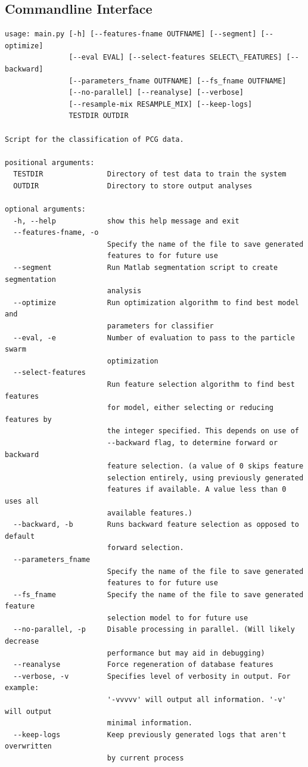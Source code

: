 \documentclass[titlepage, 12pt]{scrartcl} \usepackage{enumitem}
\begin{document}
\subsection{Commandline Interface}\label{appendixB}
\singlespacing
\lstset{basicstyle=\tiny, style=mystyle}
\begin{lstlisting}[numbers=none]
usage: main.py [-h] [--features-fname OUTFNAME] [--segment] [--optimize]
               [--eval EVAL] [--select-features SELECT\_FEATURES] [--backward]
               [--parameters_fname OUTFNAME] [--fs_fname OUTFNAME]
               [--no-parallel] [--reanalyse] [--verbose]
               [--resample-mix RESAMPLE_MIX] [--keep-logs]
               TESTDIR OUTDIR

Script for the classification of PCG data.

positional arguments:
  TESTDIR               Directory of test data to train the system
  OUTDIR                Directory to store output analyses

optional arguments:
  -h, --help            show this help message and exit
  --features-fname, -o
                        Specify the name of the file to save generated
                        features to for future use
  --segment             Run Matlab segmentation script to create segmentation
                        analysis
  --optimize            Run optimization algorithm to find best model and
                        parameters for classifier
  --eval, -e            Number of evaluation to pass to the particle swarm
                        optimization
  --select-features
                        Run feature selection algorithm to find best features
                        for model, either selecting or reducing features by
                        the integer specified. This depends on use of
                        --backward flag, to determine forward or backward
                        feature selection. (a value of 0 skips feature
                        selection entirely, using previously generated
                        features if available. A value less than 0 uses all
                        available features.)
  --backward, -b        Runs backward feature selection as opposed to default
                        forward selection.
  --parameters_fname
                        Specify the name of the file to save generated
                        features to for future use
  --fs_fname            Specify the name of the file to save generated feature
                        selection model to for future use
  --no-parallel, -p     Disable processing in parallel. (Will likely decrease
                        performance but may aid in debugging)
  --reanalyse           Force regeneration of database features
  --verbose, -v         Specifies level of verbosity in output. For example:
                        '-vvvvv' will output all information. '-v' will output
                        minimal information.
  --keep-logs           Keep previously generated logs that aren't overwritten
                        by current process
\end{lstlisting}
\doublespacing
\pagebreak{}
\printbibliography{}
\end{document}
